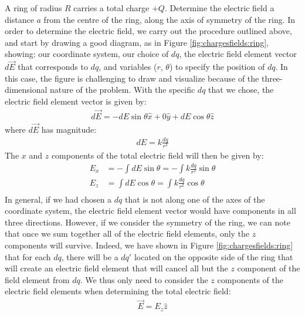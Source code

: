 \vspace{-0.4cm}
\begin{example}{\label{ex:chargesfields:ring}A ring of radius $R$ carries a total charge $+Q$. Determine the electric field a distance $a$ from the centre of the ring, along the axis of symmetry of the ring.}
In order to determine the electric field, we carry out the procedure outlined above, and start by drawing a good diagram, as in Figure \ref{fig:chargesfields:ring}, showing: our coordinate system, our choice of $dq$, the electric field element vector $d\vec E$ that corresponds to $dq$, and variables ($r$, $\theta$) to specify the position of $dq$.
In this case, the figure is challenging to draw and visualize because of the three-dimensional nature of the problem. With the specific $dq$ that we chose, the electric field element vector is given by:
\begin{align*}
d\vec E = -dE\sin\theta \hat x + 0\hat y + dE\cos\theta \hat z 
\end{align*}
where $d\vec E$ has magnitude:
\begin{align*}
dE = k\frac{dq}{r^2}
\end{align*}
The $x$ and $z$ components of the total electric field will then be given by:
\begin{align*}
E_x &= -\int dE\sin\theta=-\int k\frac{dq}{r^2}\sin\theta\\
E_z &= \int dE\cos\theta=\int k\frac{dq}{r^2}\cos\theta \\
\end{align*}
In general, if we had chosen a $dq$ that is not along one of the axes of the coordinate system, the electric field element vector would have components in all three directions. However, if we consider the symmetry of the ring, we can note that once we sum together all of the electric field elements, only the $z$ components will survive. Indeed, we have shown in Figure \ref{fig:chargesfields:ring} that for each $dq$, there will be a $dq'$ located on the opposite side of the ring that will create an electric field element that will cancel all but the $z$ component of the field element from $dq$. We thus only need to consider the $z$ components of the electric field elements when determining the total electric field:
\begin{align*}
\vec E = E_z\hat z
\end{align*}

\end{example}
